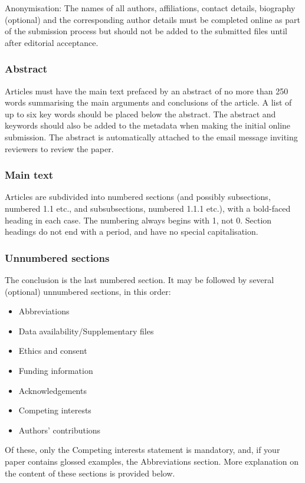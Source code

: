 \documentclass[charis,linguex,biblatex]{glossa}
\begin{document}
Anonymisation: The names of all authors, affiliations, contact details, biography (optional) and the corresponding author details must be completed online as part of the submission process but should not be added to the submitted files until after editorial acceptance.

\subsubsection{Abstract}

Articles must have the main text prefaced by an abstract of no more than 250 words summarising the main arguments and conclusions of the article. A list of up to six key words should be placed below the abstract. The abstract and keywords should also be added to the metadata when making the initial online submission. The abstract is automatically attached to the email message inviting reviewers to review the paper.

\subsubsection{Main text}

Articles are subdivided into numbered sections (and possibly subsections, numbered 1.1 etc., and subsubsections, numbered 1.1.1 etc.), with a bold-faced heading in each case. The numbering always begins with 1, not 0. Section headings do not end with a period, and have no special capitalisation.

\subsubsection{Unnumbered sections}
The conclusion is the last numbered section. It may be followed by several (optional) unnumbered sections, in this order: 
\begin{itemize}
\item Abbreviations
\item Data availability/Supplementary files
\item Ethics and consent
\item Funding information
\item Acknowledgements
\item Competing interests
\item Authors' contributions
\end{itemize}

\noindent Of these, only the Competing interests statement is mandatory, and, if your paper contains glossed examples, the Abbreviations section. More explanation on the content of these sections is provided below.
\end{document}
